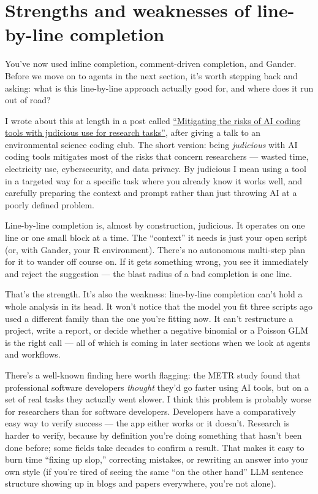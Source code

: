 \documentclass[
  letterpaper,
  DIV=11,
  numbers=noendperiod]{scrreprt}
\begin{document}
\chapter{Strengths and weaknesses of line-by-line
completion}\label{strengths-and-weaknesses-of-line-by-line-completion}

You've now used inline completion, comment-driven completion, and
Gander. Before we move on to agents in the next section, it's worth
stepping back and asking: what is this line-by-line approach actually
good for, and where does it run out of road?

I wrote about this at length in a post called
\href{https://www.seascapemodels.org/posts/2026-05-09-judicious-AI-use/}{``Mitigating
the risks of AI coding tools with judicious use for research tasks''},
after giving a talk to an environmental science coding club. The short
version: being \emph{judicious} with AI coding tools mitigates most of
the risks that concern researchers --- wasted time, electricity use,
cybersecurity, and data privacy. By judicious I mean using a tool in a
targeted way for a specific task where you already know it works well,
and carefully preparing the context and prompt rather than just throwing
AI at a poorly defined problem.

Line-by-line completion is, almost by construction, judicious. It
operates on one line or one small block at a time. The ``context'' it
needs is just your open script (or, with Gander, your R environment).
There's no autonomous multi-step plan for it to wander off course on. If
it gets something wrong, you see it immediately and reject the
suggestion --- the blast radius of a bad completion is one line.

That's the strength. It's also the weakness: line-by-line completion
can't hold a whole analysis in its head. It won't notice that the model
you fit three scripts ago used a different family than the one you're
fitting now. It can't restructure a project, write a report, or decide
whether a negative binomial or a Poisson GLM is the right call --- all
of which is coming in later sections when we look at agents and
workflows.

There's a well-known finding here worth flagging: the METR study found
that professional software developers \emph{thought} they'd go faster
using AI tools, but on a set of real tasks they actually went slower. I
think this problem is probably worse for researchers than for software
developers. Developers have a comparatively easy way to verify success
--- the app either works or it doesn't. Research is harder to verify,
because by definition you're doing something that hasn't been done
before; some fields take decades to confirm a result. That makes it easy
to burn time ``fixing up slop,'' correcting mistakes, or rewriting an
answer into your own style (if you're tired of seeing the same ``on the
other hand'' LLM sentence structure showing up in blogs and papers
everywhere, you're not alone).
\end{document}
